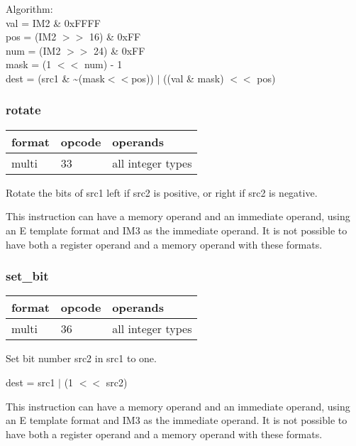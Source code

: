 \documentclass[forwardcom.tex]{subfiles}
\begin{document}
Algorithm:\\
val = IM2 \& 0xFFFF\\
pos = (IM2 $>>$ 16) \& 0xFF\\
num = (IM2 $>>$ 24) \& 0xFF\\
mask = (1 $<<$ num) - 1\\

dest = (src1 \& \~{}(mask$<<$pos)) $|$ ((val \& mask) $<<$ pos)
\vspace{2mm}


\subsubsection{rotate}
\label{table:rotateInstruction}
\begin{tabular}{|p{12mm}|p{12mm}|p{110mm}|}
\hline
\bfseries format & \bfseries opcode & \bfseries operands \\ \hline
multi & 33 & all integer types \\ \hline
\end{tabular}
\vspace{2mm}

Rotate the bits of src1 left if src2 is positive, or right if src2 is negative.

\vspace{2mm}
This instruction can have a memory operand and an immediate operand, using an E template format and IM3  as the immediate operand. It is not possible to have both a register operand and a memory operand with these formats.
\vspace{2mm}

\subsubsection{set\_bit}
\label{table:setBitInstruction}
\begin{tabular}{|p{12mm}|p{12mm}|p{110mm}|}
\hline
\bfseries format & \bfseries opcode & \bfseries operands \\ \hline
multi & 36 & all integer types \\ \hline
\end{tabular}
\vspace{2mm}

Set bit number src2 in src1 to one.
\vspace{2mm}

dest = src1 $|$ (1 $<<$ src2)

\vspace{2mm}
This instruction can have a memory operand and an immediate operand, using an E template format and IM3  as the immediate operand. It is not possible to have both a register operand and a memory operand with these formats.
\vspace{2mm}
\end{document}
